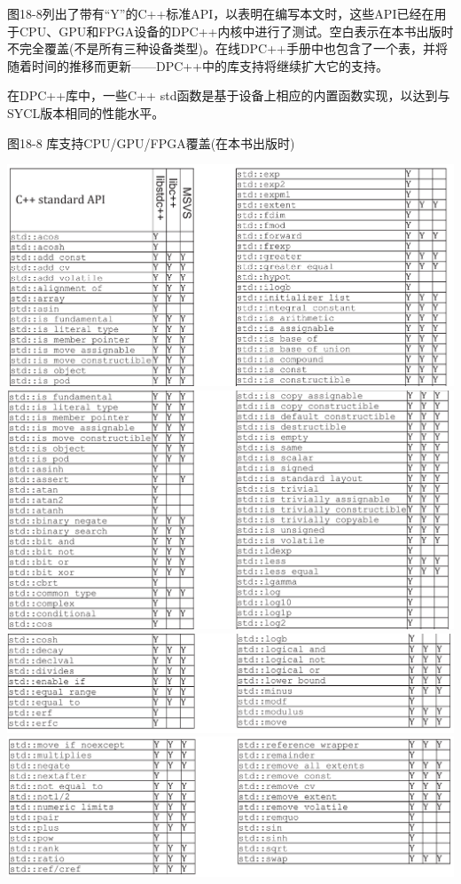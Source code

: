 图18-8列出了带有“Y”的C++标准API，以表明在编写本文时，这些API已经在用于CPU、GPU和FPGA设备的DPC++内核中进行了测试。空白表示在本书出版时不完全覆盖(不是所有三种设备类型)。在线DPC++手册中也包含了一个表，并将随着时间的推移而更新——DPC++中的库支持将继续扩大它的支持。\par

在DPC++库中，一些C++ std函数是基于设备上相应的内置函数实现，以达到与SYCL版本相同的性能水平。\par

\hspace*{\fill} \par %
图18-8 库支持CPU/GPU/FPGA覆盖(在本书出版时)
\begin{center}
	\includegraphics[width=1.0\textwidth]{content/chapter-18/images/7}
	\includegraphics[width=1.0\textwidth]{content/chapter-18/images/8}
	\includegraphics[width=1.0\textwidth]{content/chapter-18/images/9}
	\includegraphics[width=1.0\textwidth]{content/chapter-18/images/10}
\end{center}


